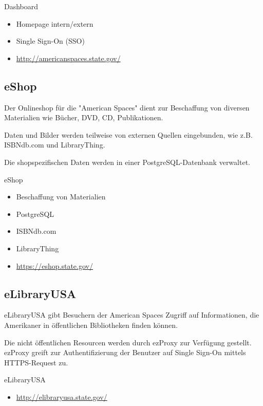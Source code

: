 \begin{frame}{Dashboard}
\begin{itemize}
\item Homepage intern/extern
\item Single Sign-On (SSO)
\item \url{http://americanspaces.state.gov/}
\end{itemize}
\end{frame}
    
\subsection{eShop}

Der Onlineshop für die "American Spaces" dient zur Beschaffung von
diversen Materialien wie Bücher, DVD, CD, Publikationen.

Daten und Bilder werden teilweise von externen Quellen eingebunden,
wie z.B. ISBNdb.com und LibraryThing.

Die shopspezifischen Daten werden in einer PostgreSQL-Datenbank
verwaltet.

\begin{frame}{eShop}
\begin{itemize}
\item Beschaffung von Materialien
\item PostgreSQL
\item ISBNdb.com
\item LibraryThing
\item \url{https://eshop.state.gov/}
\end{itemize}
\end{frame}
    
\subsection{eLibraryUSA}

eLibraryUSA gibt Besuchern der American Spaces Zugriff
auf Informationen, die Amerikaner in öffentlichen
Bibliotheken finden können.
    
Die nicht öffentlichen Resourcen werden durch ezProxy zur
Verfügung gestellt. ezProxy greift zur Authentifizierung
der Benutzer auf Single Sign-On mittels HTTPS-Request zu.

\begin{frame}{eLibraryUSA}
\begin{itemize}
\item \url{http://elibraryusa.state.gov/}
\end{itemize}
\end{frame}

